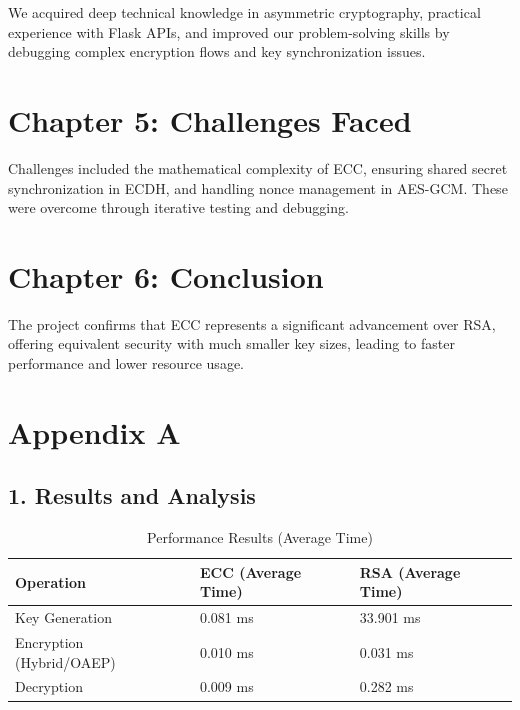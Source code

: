 \documentclass[12pt, a4paper]{report}
\begin{document}
We acquired deep technical knowledge in asymmetric cryptography, practical experience with Flask APIs, and improved our problem-solving skills by debugging complex encryption flows and key synchronization issues.

\chapter*{Chapter 5: Challenges Faced}

Challenges included the mathematical complexity of ECC, ensuring shared secret synchronization in ECDH, and handling nonce management in AES-GCM. These were overcome through iterative testing and debugging.

\chapter*{Chapter 6: Conclusion}

The project confirms that ECC represents a significant advancement over RSA, offering equivalent security with much smaller key sizes, leading to faster performance and lower resource usage.

\chapter*{Appendix A}

\section{1. Results and Analysis}

\begin{table}[H]
\centering
\caption{Performance Results (Average Time)}
\label{tab:results}
\renewcommand{\arraystretch}{1.5}
\begin{tabularx}{\textwidth}{L X X}
\toprule
\textbf{Operation} & \textbf{ECC (Average Time)} & \textbf{RSA (Average Time)} \\
\midrule
Key Generation & 0.081 ms & 33.901 ms \\
Encryption (Hybrid/OAEP) & 0.010 ms & 0.031 ms \\
Decryption & 0.009 ms & 0.282 ms \\
\bottomrule
\end{tabularx}
\end{table}
\end{document}
